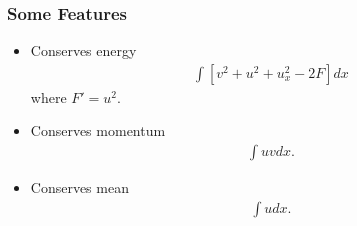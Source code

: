 \documentclass{beamer}
\numberwithin{equation*}{section}
\begin{document}
\begin{frame}
\frametitle{Some Features}
\begin{itemize}
\item{}
Conserves energy
\begin{gather*}
  \int [v^{2} + u^{2} + u_{x}^{2} - 2F] dx
\end{gather*}
where $F' = u^{2}$.
\pause
\item{} Conserves momentum
\begin{gather*}
  \int uv dx.
\end{gather*}
\pause
\item{}
Conserves mean
\begin{gather*}
  \int u dx.
\end{gather*}
\end{itemize}
\end{frame}
\end{document}
